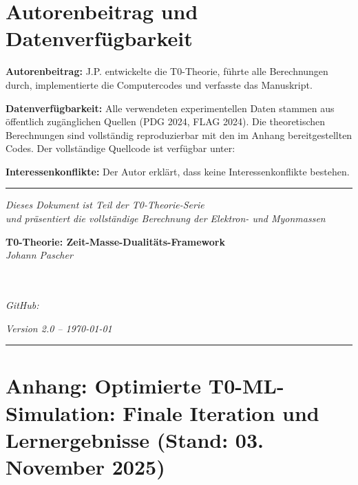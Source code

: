 	\section*{Autorenbeitrag und Datenverfügbarkeit}
	
	\textbf{Autorenbeitrag:} J.P. entwickelte die T0-Theorie, führte alle Berechnungen durch, implementierte die Computercodes und verfasste das Manuskript.
	
	\textbf{Datenverfügbarkeit:} Alle verwendeten experimentellen Daten stammen aus öffentlich zugänglichen Quellen (PDG 2024, FLAG 2024). Die theoretischen Berechnungen sind vollständig reproduzierbar mit den im Anhang bereitgestellten Codes. Der vollständige Quellcode ist verfügbar unter: 
	
	\textbf{Interessenkonflikte:} Der Autor erklärt, dass keine Interessenkonflikte bestehen.
	
	\vspace{1cm}
	
	\begin{center}
		\rule{0.8\textwidth}{0.4pt}
		\vspace{0.5cm}
		
		\textit{Dieses Dokument ist Teil der T0-Theorie-Serie}\\
		\textit{und präsentiert die vollständige Berechnung der Elektron- und Myonmassen}\\
		\vspace{0.3cm}
		
		\textbf{T0-Theorie: Zeit-Masse-Dualitäts-Framework}\\
		\textit{Johann Pascher}\\
		\textit{}\\
		\vspace{0.3cm}
		
		\textit{}\\
		\textit{GitHub: }\\
		\vspace{0.3cm}
		
		\textit{Version 2.0 -- \today}\\
		\vspace{0.2cm}
		
		\rule{0.8\textwidth}{0.4pt}
	\end{center}
	
	\section*{Anhang: Optimierte T0-ML-Simulation: Finale Iteration und Lernergebnisse (Stand: 03. November 2025)}
	

